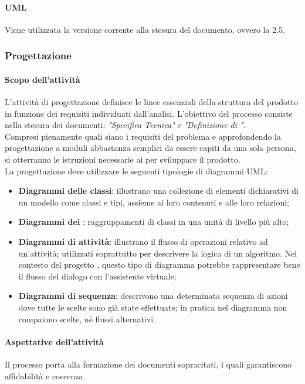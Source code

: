  \paragraph{UML}
 Viene utilizzata la versione corrente alla stesura del documento, ovvero la 2.5.
 \subsubsection{Progettazione}\label{progettazione}
 \paragraph{Scopo dell'attività}
 L'attività di progettazione definisce le linee essenziali della struttura del prodotto  in
 funzione dei requisiti individuati dall'analisi. L'obiettivo del processo consiste nella stesura dei
 documenti: \textit{"Specifica Tecnica"} e \textit{"Definizione di "}. \\
 Compresi pienamente quali siano i requisiti del problema e approfondendo la progettazione a moduli
 abbastanza semplici da essere capiti da una sola persona, si otterranno le
 istruzioni necessarie ai \PRP{} per sviluppare il prodotto.\\
 La progettazione deve utilizzare le seguenti tipologie di diagrammi UML:
 \begin{itemize}
 	\item \textbf{Diagrammi delle classi}: illustrano una collezione di elementi dichiarativi di un modello	come classi e tipi, assieme ai loro contenuti e alle loro relazioni;
 	\item \textbf{Diagrammi dei }: raggruppamenti di classi in una unità di livello più alto;
 	\item \textbf{Diagrammi di attività}: illustrano il flusso di operazioni relativo ad un’attività; utilizzati	soprattutto per descrivere la logica di un algoritmo. Nel contesto del progetto \PROGETTO, questo tipo di diagramma potrebbe rappresentare bene il flusso del dialogo con l'assistente virtuale;
 	\item \textbf{Diagrammi di sequenza}: descrivono una determinata sequenza di azioni dove tutte le
 	scelte sono già state effettuate; in pratica nel diagramma non compaiono scelte, né flussi
 	alternativi.
 \end{itemize}
 \paragraph{Aspettative dell'attività}
 Il processo porta alla formazione dei documenti sopracitati, i quali garantiscono affidabilità e
 coerenza.
